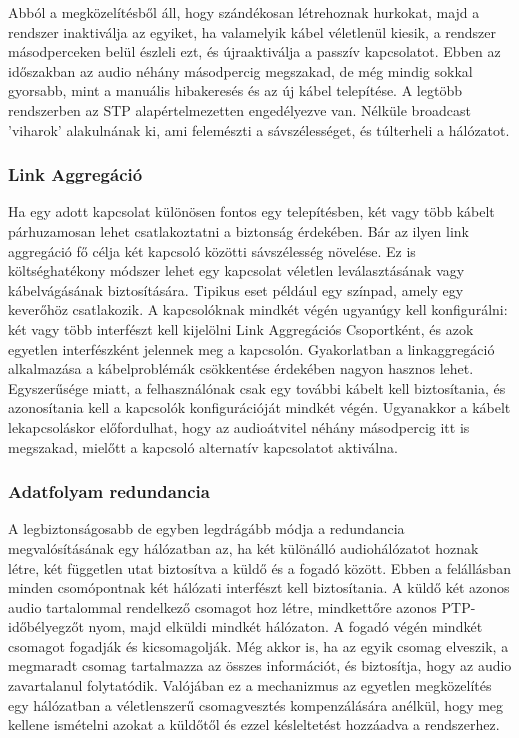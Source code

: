 Abból a  megközelítésből áll, hogy szándékosan létrehoznak hurkokat, majd a rendszer
inaktiválja az egyiket, ha valamelyik kábel véletlenül kiesik, a rendszer
másodperceken belül észleli ezt, és újraaktiválja a passzív kapcsolatot. Ebben
az időszakban az audio néhány másodpercig megszakad, de még mindig sokkal
gyorsabb, mint a manuális hibakeresés és az új kábel telepítése. 
A legtöbb rendszerben az STP alapértelmezetten engedélyezve van. 
Nélküle broadcast 'viharok' alakulnának ki, ami felemészti a sávszélességet, és túlterheli a hálózatot.

\subsubsection{Link Aggregáció}
Ha egy adott kapcsolat különösen fontos egy telepítésben, két vagy több kábelt párhuzamosan
lehet csatlakoztatni a biztonság érdekében. 
Bár az ilyen link aggregáció fő célja két kapcsoló közötti sávszélesség növelése. 
Ez is költséghatékony módszer lehet egy kapcsolat véletlen leválasztásának
vagy kábelvágásának biztosítására. Tipikus eset például egy színpad, amely egy keverőhöz
csatlakozik. A kapcsolóknak mindkét végén ugyanúgy kell konfigurálni: két vagy
több interfészt kell kijelölni Link Aggregációs Csoportként, és azok
egyetlen interfészként jelennek meg a kapcsolón. Gyakorlatban a linkaggregáció
alkalmazása a kábelproblémák csökkentése érdekében nagyon hasznos lehet.
Egyszerűsége miatt, a felhasználónak csak egy további kábelt kell
biztosítania, és azonosítania kell a kapcsolók konfigurációját mindkét végén.
Ugyanakkor a kábelt lekapcsoláskor előfordulhat, hogy az audioátvitel
néhány másodpercig itt is megszakad, mielőtt a kapcsoló alternatív kapcsolatot
aktiválna.
\subsubsection{ Adatfolyam redundancia}
A legbiztonságosabb de egyben legdrágább módja a redundancia megvalósításának
egy hálózatban az, ha két különálló audiohálózatot hoznak létre, 
két független utat biztosítva a küldő és a fogadó között. 
Ebben a felállásban minden csomópontnak két hálózati interfészt
kell biztosítania. A küldő két azonos audio tartalommal rendelkező csomagot hoz létre,
mindkettőre azonos PTP-időbélyegzőt nyom, majd elküldi mindkét hálózaton.
A fogadó végén mindkét csomagot fogadják és kicsomagolják. Még akkor is, ha az egyik csomag
elveszik, a megmaradt csomag tartalmazza az összes információt, és biztosítja,
hogy az audio zavartalanul folytatódik. Valójában ez a mechanizmus az egyetlen
megközelítés egy hálózatban a véletlenszerű csomagvesztés kompenzálására anélkül,
hogy meg kellene ismételni azokat a küldőtől és ezzel késleltetést hozzáadva a rendszerhez.
